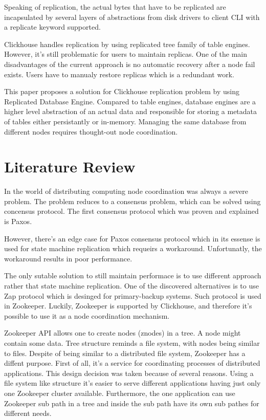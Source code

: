 \documentclass[conference]{IEEEtran}
\begin{document}
Speaking of replication, the actual bytes that have to be replicated are incapsulated %
by several layers of abstractions from disk drivers to client CLI with a replicate
keyword supported.

Clickhouse handles replication by using replicated tree family of table engines.
However, it's still problematic for users to maintain replicas. One of the
main disadvantages of the current approach is no automatic recovery after a node fail exists.
Users have to manualy restore replicas which is a redundant work.

This paper proposes a solution for Clickhouse replication problem by using Replicated
Database Engine. Compared to table engines, database engines are a higher level abstraction
of an actual data and responsible for storing a metadata of tables either persistantly or
in-memory. Managing the same database from different nodes requires thought-out node coordination.

\section{Literature Review}
In the world of distributing computing node coordination was %
always a severe problem. The problem reduces to a consensus
problem, which can be solved using concensus protocol. The first consensus
protocol which was proven and explained is Paxos\cite{paxos}.

However, there's an edge case for Paxos consensus protocol which in its essense is used for
state machine replication which requeirs a workaround\cite{zap}. Unfortunatly, the workaround
results in poor performance. 

The only sutable solution to still maintain performace is to use different approach %
rather that state machine replication. One of the discovered alternatives is to use %
Zap protocol which is desinged for primary-backup systems. Such protocol is used in
Zookeeper\cite{zookeeper}. Luckily, Zookeeper is supported by Clickhouse, and therefore
it's possible to use it as a node coordination mechanism.

Zookeeper API allows one to create nodes (znodes) in a tree. A node might contain some data.
Tree structure reminds a file system, with nodes being similar to files.
Despite of being similar to a distributed file system, Zookeeper has a diffent purpose.
First of all, it's a service for coordinating processes of distributed applications.
This design decision was taken because of several reasons. Using a file system like
structure it's easier to serve different applications having just only one Zookeeper cluster %
available. Furthermore, the one application can use Zookeeper sub path in a tree
and inside the sub path have its own sub pathes for different needs.
\end{document}
